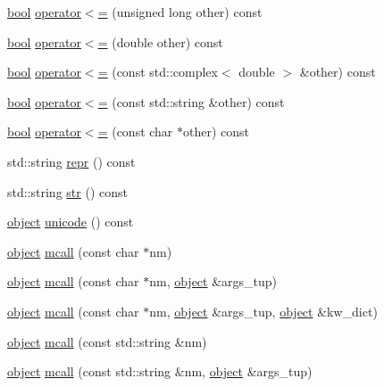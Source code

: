 \begin{DoxyCompactItemize}
\item 
\hyperlink{compiler_8h_abb452686968e48b67397da5f97445f5b}{bool} \hyperlink{classpy_1_1object_a6fb3615937683e8a8de0125f4c1202cf}{operator$<$=} (unsigned long other) const 
\item 
\hyperlink{compiler_8h_abb452686968e48b67397da5f97445f5b}{bool} \hyperlink{classpy_1_1object_a3c354e6e5dd59443273e7a72e87c7043}{operator$<$=} (double other) const 
\item 
\hyperlink{compiler_8h_abb452686968e48b67397da5f97445f5b}{bool} \hyperlink{classpy_1_1object_a71da55d2dcb7fd2a3ce3863e7180aa15}{operator$<$=} (const std\+::complex$<$ double $>$ \&other) const 
\item 
\hyperlink{compiler_8h_abb452686968e48b67397da5f97445f5b}{bool} \hyperlink{classpy_1_1object_ac6778583b80bbd9fdde8b570c39fa07c}{operator$<$=} (const std\+::string \&other) const 
\item 
\hyperlink{compiler_8h_abb452686968e48b67397da5f97445f5b}{bool} \hyperlink{classpy_1_1object_a691b428ca9c05425170179babdff9cbb}{operator$<$=} (const char $\ast$other) const 
\item 
std\+::string \hyperlink{classpy_1_1object_abfb3e6aa95b3a9d0cdb15df90d770851}{repr} () const 
\item 
std\+::string \hyperlink{classpy_1_1object_a4ee1d012735a0ea49a6c174ad5d2b375}{str} () const 
\item 
\hyperlink{classpy_1_1object}{object} \hyperlink{classpy_1_1object_a52d2ac6309dc24c927305f077595a462}{unicode} () const 
\item 
\hyperlink{classpy_1_1object}{object} \hyperlink{classpy_1_1object_a2ce14983f8598f350d16d4f7f3921a84}{mcall} (const char $\ast$nm)
\item 
\hyperlink{classpy_1_1object}{object} \hyperlink{classpy_1_1object_a1faa0c6874ad527bd561e1e6d6f689df}{mcall} (const char $\ast$nm, \hyperlink{classpy_1_1object}{object} \&args\+\_\+tup)
\item 
\hyperlink{classpy_1_1object}{object} \hyperlink{classpy_1_1object_a873ebb8fc9606dc4c3789ac6a853ef04}{mcall} (const char $\ast$nm, \hyperlink{classpy_1_1object}{object} \&args\+\_\+tup, \hyperlink{classpy_1_1object}{object} \&kw\+\_\+dict)
\item 
\hyperlink{classpy_1_1object}{object} \hyperlink{classpy_1_1object_a65b5bec82f4d2645a43c526bba64ce67}{mcall} (const std\+::string \&nm)
\item 
\hyperlink{classpy_1_1object}{object} \hyperlink{classpy_1_1object_a654e7997ea4879a9dabfcd5d6c39f1d3}{mcall} (const std\+::string \&nm, \hyperlink{classpy_1_1object}{object} \&args\+\_\+tup)

\end{DoxyCompactItemize}
